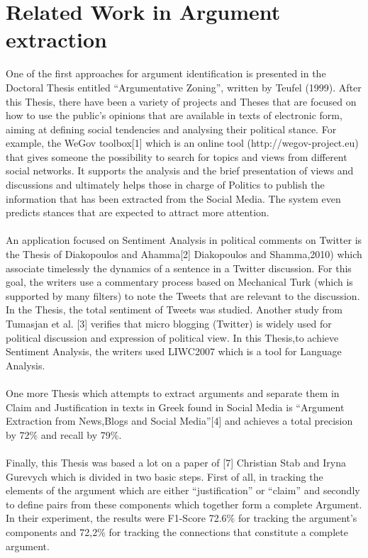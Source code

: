 \section{Related Work in Argument extraction}\label{24_ref}
One of the first approaches for argument identification is presented in the Doctoral Thesis  entitled ``Argumentative Zoning'', written by Teufel (1999). After this Thesis, there have been a variety of projects and Theses that are focused on how to use the public's opinions that are available in texts of electronic form, aiming at defining social tendencies and analysing their political stance. For example, the WeGov toolbox[1] which is an online tool (http://wegov-project.eu) that gives someone the possibility to search for topics and views from different social networks. It supports the analysis and the brief presentation of views and discussions and ultimately helps those in charge of Politics to publish the information that has been extracted from the Social Media. The system even predicts stances that are expected to attract more attention.\\
\\
An application focused on Sentiment Analysis in political comments on Twitter is the Thesis of Diakopoulos and Ahamma[2] Diakopoulos and Shamma,2010) which associate timelessly the dynamics of a sentence in a Twitter discussion. For this goal, the writers use a commentary process based on Mechanical Turk (which is supported by many filters) to note the Tweets that are relevant to the discussion. In the Thesis, the total sentiment of Tweets was studied. Another study from Tumasjan et al. [3] verifies that micro blogging (Twitter) is widely used for political discussion and expression of political view. In this Thesis,to achieve Sentiment Analysis, the writers used LIWC2007 which is a tool for Language Analysis.\\
\\
One more Thesis which attempts to extract arguments and separate them in Claim and Justification in texts in Greek found in Social Media is ``Argument Extraction from News,Blogs and Social Media''[4] and achieves a total precision by 72\% and recall by 79\%.\\
\\
Finally, this Thesis was based a lot on a paper of [7] Christian Stab and Iryna Gurevych which is divided in two basic steps. First of all, in tracking the elements of the argument which are either ``justification'' or ``claim'' and secondly to define pairs from these components which together form a complete Argument. In their experiment, the results were  F1-Score 72.6\% for tracking the argument's components and 72,2\% for tracking the connections that constitute a complete argument.
